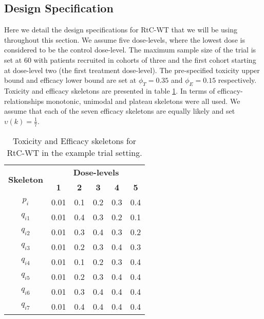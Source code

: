  \subsection{Design Specification}
 \label{WT:Design-Spec}
 
 Here we detail the design specifications for RtC-WT that we will be using throughout this section. We assume five dose-levels, where the lowest dose is considered to be the control dose-level. The maximum sample size of the trial is set at 60 with patients recruited in cohorts of three and the first cohort starting at dose-level two (the first treatment dose-level). The pre-specified toxicity upper bound and efficacy lower bound are set at $\phi_T = 0.35$ and $\phi_E = 0.15$ respectively. Toxicity and efficacy skeletons are presented in table \ref{tab_wt:tox-eff-skeleton}. In terms of efficacy-relationships monotonic, unimodal and plateau skeletons were all used. We assume that each of the seven efficacy skeletons are equally likely and set $\upsilon(k) = \frac{1}{7}$. 
 

 \begin{table}[!h]
 	\centering
 	\caption{Toxicity and Efficacy skeletons for RtC-WT in the example trial setting. }
 	\label{tab_wt:tox-eff-skeleton}
 	\begin{tabular}{c|ccccc}
 		\hline
 		\multicolumn{1}{c|}{\multirow{2}{*}{\textbf{Skeleton}}} & \multicolumn{5}{c}{\textbf{Dose-levels}}                       \\
 		\multicolumn{1}{c|}{}                                   & \textbf{1} & \textbf{2} & \textbf{3} & \textbf{4} & \textbf{5} \\ \hline
 		$p_i$    & 0.01 & 0.1 & 0.2 & 0.3 & 0.4 \\
 		$q_{i1}$ & 0.01 & 0.4 & 0.3 & 0.2 & 0.1 \\
 		$q_{i2}$ & 0.01 & 0.3 & 0.4 & 0.3 & 0.2 \\
 		$q_{i3}$ & 0.01 & 0.2 & 0.3 & 0.4 & 0.3 \\
 		$q_{i4}$ & 0.01 & 0.1 & 0.2 & 0.3 & 0.4 \\
 		$q_{i5}$ & 0.01 & 0.2 & 0.3 & 0.4 & 0.4 \\
 		$q_{i6}$ & 0.01 & 0.3 & 0.4 & 0.4 & 0.4 \\
 		$q_{i7}$ & 0.01 & 0.4 & 0.4 & 0.4 & 0.4 \\ \hline
 	\end{tabular}
 \end{table}
 
